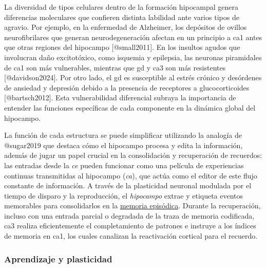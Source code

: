 \documentclass[
  11pt]{../MastersDoctoralThesisUNAM}
\begin{document}
La diversidad de tipos celulares dentro de la formación hipocampal
genera diferencias moleculares que confieren distinta labilidad ante
varios tipos de agravio. Por ejemplo, en la enfermedad de Alzheimer, los
depósitos de ovillos neurofibrilares que generan neurodegeneración
afectan en un principio a \ac{ca}1 antes que otras regiones del
hipocampo {[}@small2011{]}. En los insultos agudos que involucran daño
excitotóxico, como isquemia y epilepsia, las neuronas piramidales de
\ac{ca}1 son más vulnerables, mientras que \ac{gd} y \ac{ca}3 son más
resistentes {[}@davidson2024{]}. Por otro lado, el \ac{gd} es
susceptible al estrés crónico y desórdenes de ansiedad y depresión
debido a la presencia de receptores a glucocorticoides
{[}@bartsch2012{]}. Esta vulnerabilidad diferencial subraya la
importancia de entender las funciones específicas de cada componente en
la dinámica global del hipocampo.

La función de cada estructura se puede simplificar utilizando la
analogía de @sugar2019 que destaca cómo el hipocampo procesa y edita la
información, además de jugar un papel crucial en la consolidación y
recuperación de recuerdos: las entradas desde la \emph{\ac{ce}} pueden
funcionar como una película de experiencias continuas transmitidas al
hipocampo (\emph{\ac{ca}}), que actúa como el editor de este flujo
constante de información. A través de la plasticidad neuronal modulada
por el tiempo de disparo y la reproducción, el \emph{hipocampo} extrae y
etiqueta eventos memorables para consolidarlos en la
\href{AppendixB.qmd\#term-id-2}{memoria episódica}. Durante la
recuperación, incluso con una entrada parcial o degradada de la traza de
memoria codificada, \ac{ca}3 realiza eficientemente el completamiento de
patrones e instruye a los índices de memoria en \ac{ca}1, los cuales
canalizan la reactivación cortical para el recuerdo.

\subsubsection{Aprendizaje y plasticidad}\label{sec-sph}
\end{document}
